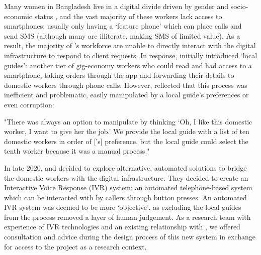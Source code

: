 Many women in Bangladesh live in a digital divide driven by gender and socio-economic status \cite{Genilo2015}, and the vast majority of these workers lack access to smartphones: usually only having a `feature phone' which can place calls and send SMS (although many are illiterate, making SMS of limited value). As a result, the majority of \PC{}'s workforce are unable to directly interact with the digital infrastructure to respond to client requests. In response, \PC{} initially introduced `local guides': another tier of gig-economy workers who could read and had access to a smartphone, taking orders through the app and forwarding their details to domestic workers through phone calls. However, \PC{} reflected that this process was inefficient and problematic, easily manipulated by a local guide's preferences or even corruption:

\begin{displayquote}
"There was always an option to manipulate by thinking ‘Oh, I like this domestic worker, I want to give her the job.’ We provide the local guide with a list of ten domestic workers in order of [\PC{}'s] preference, but the local guide could select the tenth worker because it was a manual process."
\end{displayquote}

In late 2020, \PC{} and \NGO{} decided to explore alternative, automated solutions to bridge the domestic workers with the digital infrastructure. They decided to create an Interactive Voice Response (IVR) system: an automated telephone-based system which can be interacted with by callers through button presses. An automated IVR system was deemed to be more `objective', as excluding the local guides from the process removed a layer of human judgement. As a research team with experience of IVR technologies and an existing relationship with \NGO{}, we offered consultation and advice during the design process of this new system in exchange for access to the project as a research context.